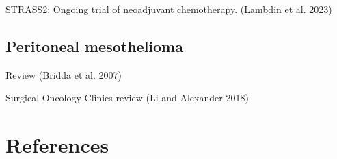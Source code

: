 \documentclass[
  letterpaper,
]{scrbook}
\begin{document}
STRASS2: Ongoing trial of neoadjuvant chemotherapy. (Lambdin et al.
2023)

\section{Peritoneal mesothelioma}\label{peritoneal-mesothelioma}

Review (Bridda et al. 2007)

Surgical Oncology Clinics review (Li and Alexander 2018)


\chapter*{References}\label{references-1}

\end{document}
